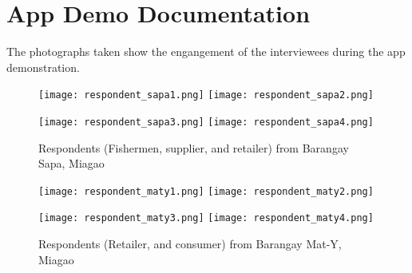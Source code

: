 %
%
%                 

\chapter{App Demo Documentation}
\label{sec:appendixd}


The photographs taken show the engangement of the interviewees during the app demonstration.

\begin{figure}[h!]
  \centering
  \texttt{[image: respondent\_sapa1.png]}
  \hfill
  \texttt{[image: respondent\_sapa2.png]}
  \par\bigskip
  \texttt{[image: respondent\_sapa3.png]}
  \hfill
  \texttt{[image: respondent\_sapa4.png]}
  \caption{Respondents (Fishermen, supplier, and retailer) from Barangay Sapa, Miagao}
  \label{fig:sapa}
\end{figure}

\begin{figure}[h!]
  \centering
  \texttt{[image: respondent\_maty1.png]}
  \hfill
  \texttt{[image: respondent\_maty2.png]}
  \par\bigskip
  \texttt{[image: respondent\_maty3.png]}
  \hfill
  \texttt{[image: respondent\_maty4.png]}
  \caption{Respondents (Retailer, and consumer) from Barangay Mat-Y, Miagao}
  \label{fig:mat-y}
\end{figure}
